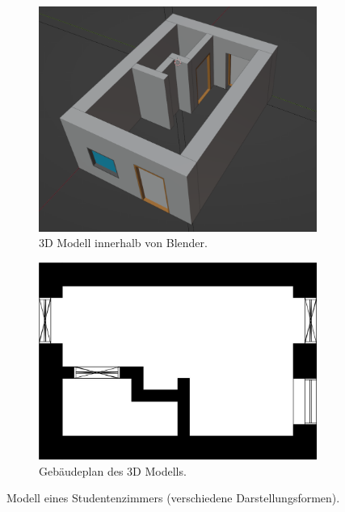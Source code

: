 \begin{figure}[ht]
  \begin{subfigure}[b]{0.44\columnwidth}
    \includegraphics[width=\columnwidth]{fig/scenario1_screenshot.png}
    \caption{3D Modell innerhalb von Blender.}
    \label{fig:Scenario1 Screenshot}
  \end{subfigure}
  \hfill
  \begin{subfigure}[b]{0.505\columnwidth}
    \includegraphics[width=\columnwidth]{fig/scenario1_story_plan.jpg}
    \caption{Gebäudeplan des 3D Modells.}
    \label{fig:Scenario1 Gebäudeplan}
  \end{subfigure}
  \label{fig:Scenario1 komplett}
  \caption{Modell eines Studentenzimmers (verschiedene Darstellungsformen).}
\end{figure}

